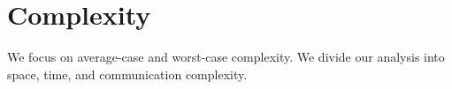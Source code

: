 





\section{Complexity}
\label{sec:complexity}


We focus on average-case and worst-case complexity. We divide our
analysis into space, time, and communication complexity.

